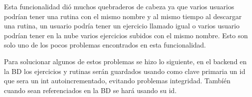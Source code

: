 
Esta funcionalidad dió muchos quebraderos de cabeza ya que varios usuarios podrían tener una rutina con el mismo nombre y al mismo tiempo al descargar una rutina, un usuario podría tener un ejercicio llamado igual o varios usuario podrían tener en la nube varios ejercicios subidos con el mismo nombre. Esto son solo uno de los pocos problemas encontrados en esta funcionalidad.

Para solucionar algunos de estos problemas se hizo lo siguiente, en el backend en la BD los ejercicios y rutinas serán guardados usando como clave primaria un id que sera un int autoincrementado, evitando problemas integridad. Tambíén cuando sean referenciados en la BD se hará usando su id.

